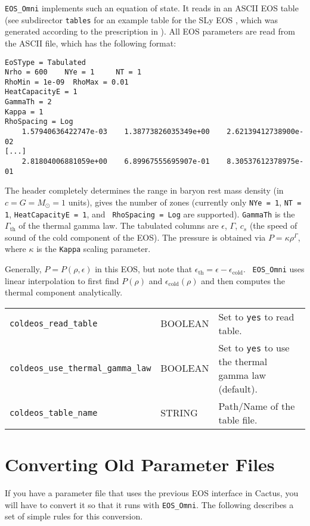 {\tt EOS\_Omni} implements such an equation of state. It reads in an
ASCII EOS table (see subdirector {\tt tables} for an example table for
the SLy EOS \cite{douchin:01,haensel:04}, which was generated
according to the prescription in \cite{shibata:05,corvino:10}). All
EOS parameters are read from the ASCII file, which has the following
format:

\begin{verbatim}
EoSType = Tabulated
Nrho = 600    NYe = 1     NT = 1
RhoMin = 1e-09  RhoMax = 0.01
HeatCapacityE = 1
GammaTh = 2
Kappa = 1
RhoSpacing = Log
    1.57940636422747e-03    1.38773826035349e+00    2.62139412738900e-02
[...]
    2.81804006881059e+00    6.89967555695907e-01    8.30537612378975e-01
\end{verbatim}

The header completely determines the range in baryon rest mass density
(in $c=G=M_\odot=1$ units), gives the number of zones (currently only
{\tt NYe = 1}, {\tt NT = 1}, {\tt HeatCapacityE = 1}, and {\tt
  RhoSpacing = Log} are supported). {\tt GammaTh} is the
$\Gamma_{\mathrm{th}}$ of the thermal gamma law. The tabulated columns
are $\epsilon$, $\Gamma$, $c_s$ (the speed of sound of the cold
component of the EOS). The pressure is obtained via $P= \kappa
\rho^\Gamma$, where $\kappa$ is the {\tt Kappa} scaling parameter.

Generally, $P = P(\rho,\epsilon)$ in this EOS, but note that
$\epsilon_{\mathrm{th}} = \epsilon - \epsilon_{\mathrm{cold}}$. {\tt
  EOS\_Omni} uses linear interpolation to first find $P(\rho)$ and
$\epsilon_{\mathrm{cold}}(\rho)$ and then computes the thermal component
analytically.


\begin{tabular}{lll}
\texttt{coldeos\_read\_table}& BOOLEAN & Set to {\tt yes} to read table.\\
\texttt{coldeos\_use\_thermal\_gamma\_law}& BOOLEAN & Set to {\tt yes} to use the thermal
gamma law (default).\\
\texttt{coldeos\_table\_name}& STRING & Path/Name of the table file.\\
\end{tabular}


\section{Converting Old Parameter Files}

If you have a parameter file that uses the previous EOS interface in
Cactus, you will have to convert it so that it runs with
\texttt{EOS\_Omni}. The following describes a set of simple rules for
this conversion.

